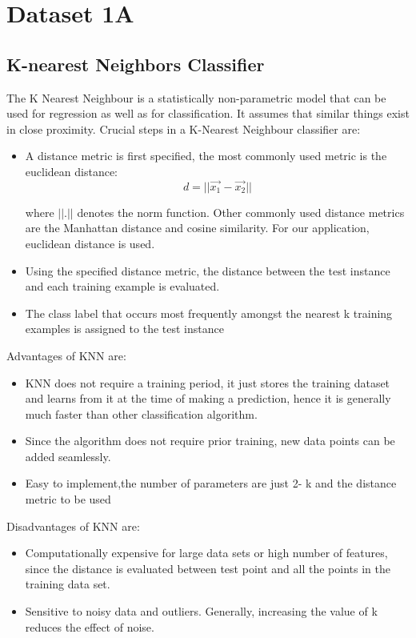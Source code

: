 \documentclass[11pt,a4paper]{article}
\newcommand{\noi}{\noindent}
\begin{document}
{\hypersetup{linkcolor=black}
 \tableofcontents}
\break


\section{Dataset 1A}
\subsection{K-nearest Neighbors Classifier}

The K Nearest Neighbour is a statistically non-parametric model that can be used for regression as well as for classification. It assumes that similar things exist in close proximity.  
\noi
Crucial steps in a K-Nearest Neighbour classifier are:
\begin{itemize}
    \item A distance metric is first specified, the most commonly used metric is the euclidean distance:
    \begin{equation}
        d=||\vec{x_{1}}-\Vec{x_{2}}||
    \end{equation}
    
    where $||.||$ denotes the norm function. Other commonly used distance metrics are the Manhattan distance and cosine similarity. For our application, euclidean distance is used. 
    \item Using the specified distance metric, the distance between the test instance and each training example is evaluated.
    \item The class label that occurs most frequently amongst the nearest k training examples is assigned to the test instance\\
\end{itemize}

\noi
Advantages of KNN are:
\begin{itemize}
    \item KNN does not require a training period, it just stores the training dataset and learns from it at the time of making a prediction, hence it is generally much faster than other classification algorithm.
    \item Since the algorithm does not require prior training, new data points can be added seamlessly. 
    \item Easy to implement,the number of parameters are just 2- k and the distance metric to be used 
\end{itemize}

\noi
Disadvantages of KNN are:
\begin{itemize}
    \item Computationally expensive for large data sets or high number of features, since the distance is evaluated between test point and all the points in the training data set. 
    \item Sensitive to noisy data and outliers. Generally, increasing the value of k reduces the effect of noise.
\end{itemize}
\end{document}
